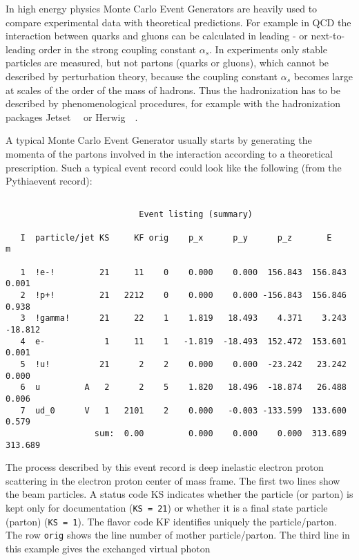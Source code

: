 \documentclass[10pt]{article} \usepackage{dina4}
\newcommand{\PYTHIAMC}{pythia64}
\def\PYTHIA{{\sc Pythia}}
\def\JETSET{{\sc Jetset}}
\def\HERWIG{{\sc Herwig}}
\begin{document}
In high energy physics Monte Carlo Event Generators are heavily used to
compare experimental  data with theoretical predictions. 
For example in QCD the interaction between 
quarks and gluons can be calculated in leading - or next-to-leading
order in the strong coupling constant $\alpha_s$.
In experiments only 
stable particles are measured, but 
not partons (quarks or gluons), which
cannot be described by perturbation theory, because the coupling constant
$\alpha_s$ becomes large at scales of the order of the mass of hadrons. 
Thus the hadronization has to be described by phenomenological procedures,
for example with the hadronization packages 
\JETSET\ ~\cite{\PYTHIAMC} 
or \HERWIG\ ~\cite{Herwig}.
\par
A typical Monte Carlo Event Generator usually starts by generating the
momenta of the partons involved in the interaction according to
a theoretical prescription. Such a typical event record could look like
the following (from the \PYTHIA event record):
{\small \begin{verbatim}

                           Event listing (summary)

   I  particle/jet KS     KF orig    p_x      p_y      p_z       E        m

   1  !e-!         21     11    0    0.000    0.000  156.843  156.843    0.001
   2  !p+!         21   2212    0    0.000    0.000 -156.843  156.846    0.938
   3  !gamma!      21     22    1    1.819   18.493    4.371    3.243  -18.812
   4  e-            1     11    1   -1.819  -18.493  152.472  153.601    0.001
   5  !u!          21      2    2    0.000    0.000  -23.242   23.242    0.000
   6  u         A   2      2    5    1.820   18.496  -18.874   26.488    0.006
   7  ud_0      V   1   2101    2    0.000   -0.003 -133.599  133.600    0.579
                  sum:  0.00         0.000    0.000    0.000  313.689  313.689

\end{verbatim} }
The process described by this event record is deep inelastic electron proton
scattering in the electron proton center of mass frame. The first two lines
show the beam particles. A status code KS indicates whether the 
particle (or parton) is kept only for documentation (\verb+KS = 21+) or 
 whether it is
a final state particle (parton) (\texttt{KS = 1}).
 The flavor code KF identifies 
uniquely the particle/parton. The row \verb+orig+ shows the line number of 
mother particle/parton. The third line in this example gives the 
exchanged virtual photon  
\end{document}
